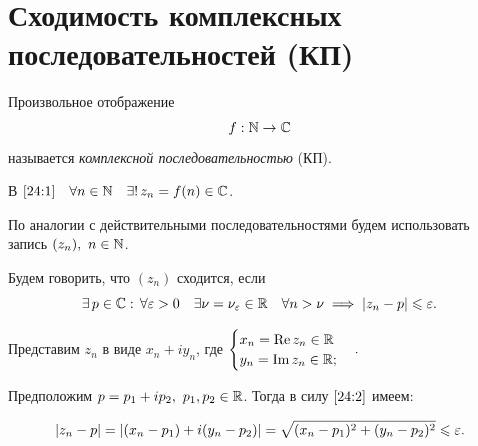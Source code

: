 \documentclass[../../main.tex]{subfiles}
\begin{document}
\section{Сходимость комплексных последовательностей (КП)}

Произвольное отображение
\begin{equation}\label{24:1}
f: \mathbb{N} \to \mathbb{C}
\end{equation}
называется \emph{комплексной последовательностью} (КП).

В $ \eqref{24:1} \quad \forall n \in \mathbb{N} \quad \exists!\, z_n = f(n) \in \mathbb{C} 
$.

По аналогии с действительными последовательностями будем использовать запись $ 
(z_n),\ n \in \mathbb{N} $.

Будем говорить, что $ (z_n) $ сходится, если
\begin{equation}\label{24:2}
	\exists\, p \in \mathbb{C} :\, \forall \varepsilon > 0\quad \exists \nu = \nu_\varepsilon \in \mathbb{R} \quad 
	\forall n > \nu \implies |z_n - p| \leqslant \varepsilon.
\end{equation}

Представим $ z_n $ в виде $x_n + i y_n$, где
$\begin{cases}
x_n = \operatorname{Re} z_n \in \mathbb{R} \\
y_n = \operatorname{Im} z_n \in \mathbb{R};
\end{cases}.$

Предположим $ p = p_1 + i p_2,\ p_1, p_2 \in \mathbb{R} $. Тогда в силу $ \eqref{24:2} 
$ имеем:

\begin{equation}\label{24:3}
	|z_n - p| = |(x_n - p_1) + i(y_n - p_2)| = \sqrt{(x_n - p_1)^2 + (y_n - 
	p_2)^2} \leqslant \varepsilon.
\end{equation}
\end{document}
